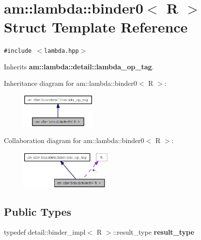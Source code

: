 \section{am::lambda::binder0$<$ R $>$ Struct Template Reference}
\label{structam_1_1lambda_1_1binder0}
{\tt \#include $<$lambda.hpp$>$}

Inherits {\bf am::lambda::detail::lambda\_\-op\_\-tag}.

Inheritance diagram for am::lambda::binder0$<$ R $>$:\begin{figure}[H]
\begin{center}
\leavevmode
\includegraphics[width=108pt]{structam_1_1lambda_1_1binder0__inherit__graph}
\end{center}
\end{figure}
Collaboration diagram for am::lambda::binder0$<$ R $>$:\begin{figure}[H]
\begin{center}
\leavevmode
\includegraphics[width=132pt]{structam_1_1lambda_1_1binder0__coll__graph}
\end{center}
\end{figure}
\subsection*{Public Types}
\begin{CompactItemize}
\item 
typedef detail::binder\_\-impl$<$ R $>$::result\_\-type \textbf{result\_\-type}\label{structam_1_1lambda_1_1binder0_dd9b026043ecf5fa477ed0a887e0cae3}

\end{CompactItemize}
